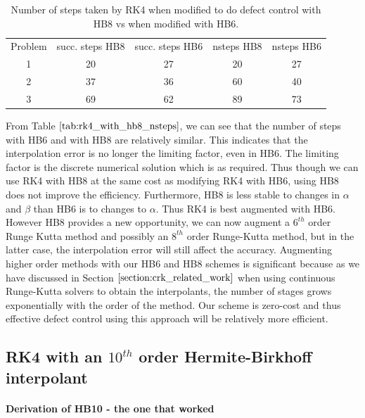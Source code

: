 \begin{table}[h]
\caption {Number of steps taken by RK4 when modified to do defect control with HB8 vs when modified with HB6.} \label{tab:rk4_with_hb8_nsteps}
\begin{center}
\begin{tabular}{ c c c c c } 
Problem & succ. steps HB8 & succ. steps HB6 & nsteps HB8 & nsteps HB6 \\ 
1       & 20                 &        27          & 20         & 27\\ 
2       & 37                 &        36          & 60         & 40\\
3       & 69                 &        62          & 89         & 73\\
\end{tabular}
\end{center}
\end{table}

From Table $\ref{tab:rk4_with_hb8_nsteps}$, we can see that the number of steps with HB6 and with HB8 are relatively similar. This indicates that the interpolation error is no longer the limiting factor, even in HB6. The limiting factor is the discrete numerical solution which is as required. Thus though we can use RK4 with HB8 at the same cost as modifying RK4 with HB6, using HB8 does not improve the efficiency. Furthermore, HB8 is less stable to changes in $\alpha$ and $\beta$ than HB6 is to changes to $\alpha$. Thus RK4 is best augmented with HB6. However HB8 provides a new opportunity, we can now augment a $6^{th}$ order Runge Kutta method and possibly an $8^{th}$ order Runge-Kutta method, but in the latter case, the interpolation error will still affect the accuracy. Augmenting higher order methods with our HB6 and HB8 schemes is significant because as we have discussed in Section $\ref{section:crk_related_work}$ when using continuous Runge-Kutta solvers to obtain the interpolants, the number of stages grows exponentially with the order of the method. Our scheme is zero-cost and thus effective defect control using this approach will be relatively more efficient.


\subsection{RK4 with an $10^{th}$ order Hermite-Birkhoff interpolant}
\label{section:HB10_derivation}
\paragraph{Derivation of HB10 - the one that worked}


